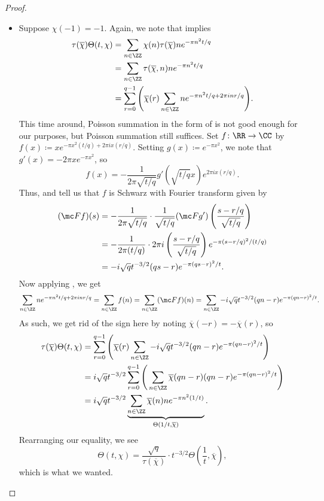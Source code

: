 \documentclass[../notes.tex]{subfiles}
\begin{document}
\begin{proof}
\begin{itemize}
		\item Suppose $\chi(-1)=-1$. Again, we note that  implies
		\begin{align*}
			\tau(\overline\chi)\Theta(t,\chi) &= \sum_{n\in\ZZ}\chi(n)\tau(\overline\chi)ne^{-\pi n^2t/q} \\
			&= \sum_{n\in\ZZ}\tau(\overline\chi,n)ne^{-\pi n^2t/q} \\
			&= \sum_{r=0}^{q-1}\Bigg(\overline\chi(r)\sum_{n\in\ZZ}ne^{-\pi n^2t/q+2\pi inr/q}\Bigg).
		\end{align*}
		This time around, Poisson summation in the form of  is not good enough for our purposes, but Poisson summation still suffices. Set $f\colon\RR\to\CC$ by $f(x)\coloneqq xe^{-\pi x^2(t/q)+2\pi ix(r/q)}$. Setting $g(x)\coloneqq e^{-\pi x^2}$, we note that $g'(x)=-2\pi xe^{-\pi x^2}$, so
		\[f(x)=-\frac1{2\pi\sqrt{t/q}}g'(\sqrt{t/q}x)e^{2\pi ix(r/q)}.\]
		Thus,  and  tell us that $f$ is Schwarz with Fourier transform given by
		\begin{align*}
			(\mc Ff)(s) &= -\frac1{2\pi\sqrt{t/q}}\cdot\frac1{\sqrt{t/q}}(\mc Fg')\left(\frac{s-r/q}{\sqrt{t/q}}\right) \\
			&= -\frac1{2\pi(t/q)}\cdot2\pi i\left(\frac{s-r/q}{\sqrt{t/q}}\right)e^{-\pi(s-r/q)^2/(t/q)} \\
			&= -i\sqrt qt^{-3/2}(qs-r)e^{-\pi(qs-r)^2/t}.
		\end{align*}
		Now applying , we get
		\[\sum_{n\in\ZZ}ne^{-\pi n^2t/q+2\pi inr/q}=\sum_{n\in\ZZ}f(n)=\sum_{n\in\ZZ}(\mc Ff)(n)=\sum_{n\in\ZZ}-i\sqrt qt^{-3/2}(qn-r)e^{-\pi(qn-r)^2/t}.\]
		As such, we get rid of the sign here by noting $\overline\chi(-r)=-\overline\chi(r)$, so
		\begin{align*}
			\tau(\overline\chi)\Theta(t,\chi) &= \sum_{r=0}^{q-1}\Bigg(\overline\chi(r)\sum_{n\in\ZZ}-i\sqrt qt^{-3/2}(qn-r)e^{-\pi(qn-r)^2/t}\Bigg) \\
			&= i\sqrt qt^{-3/2}\sum_{r=0}^{q-1}\Bigg(\sum_{n\in\ZZ}\overline\chi(qn-r)(qn-r)e^{-\pi(qn-r)^2/t}\Bigg) \\
			&= i\sqrt qt^{-3/2}\underbrace{\sum_{n\in\ZZ}\overline\chi(n)ne^{-\pi n^2(1/t)}}_{\Theta(1/t,\overline\chi)}.
		\end{align*}
		Rearranging our equality, we see
		\[\Theta(t,\chi)=\frac{\sqrt q}{\tau(\overline\chi)}\cdot t^{-3/2}\Theta\left(\frac1t,\overline\chi\right),\]
		which is what we wanted.
		\qedhere
	\end{itemize}
\end{proof}
\end{document}
